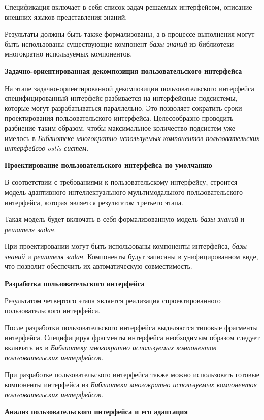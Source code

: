 {Спецификация включает в себя список задач решаемых интерфейсом, описание внешних языков представления знаний.

Результаты должны быть также формализованы, а в процессе выполнения могут быть использованы существующие компонент \textit{базы знаний} из библиотеки многократно используемых компонентов.

\textbf{Задачно-ориентированная декомпозиция пользовательского интерфейса}

На этапе задачно-ориентированной декомпозиции пользовательского интерфейса специфицированный интерфейс разбивается на интерфейсные подсистемы, которые могут разрабатываться параллельно. Это позволяет сократить сроки проектирования пользовательского интерфейса. Целесообразно проводить разбиение таким образом, чтобы максимальное количество подсистем уже имелось в \textit{Библиотеке многократно используемых компонентов пользовательских интерфейсов ostis-систем}.

\textbf{Проектирование пользовательского интерфейса по умолчанию}

В соответствии с требованиями к пользовательскому интерфейсу, строится модель адаптивного интеллектуального мультимодального пользовательского интерфейса, которая является результатом третьего этапа.

Такая модель будет включать в себя формализованную модель \textit{базы знаний} и \textit{решателя задач}.

При проектировании могут быть использованы компоненты интерфейса, \textit{базы знаний} и \textit{решателя задач}. Компоненты будут записаны в унифицированном виде, что позволит обеспечить их автоматическую совместимость.

\textbf{Разработка пользовательского интерфейса}

Результатом четвертого этапа является реализация спроектированного пользовательского интерфейса. 

После разработки пользовательского интерфейса выделяются типовые фрагменты интерфейса. Специфицируя фрагменты интерфейса необходимым образом следует включать их в \textit{Библиотеку многократно используемых компонентов пользовательских интерфейсов}.

При разработке пользовательского интерфейса также можно использовать готовые компоненты интерфейса из \textit{Библиотеки многократно используемых компонентов пользовательских интерфейсов}.

\textbf{Анализ пользовательского интерфейса и его адаптация}

}
